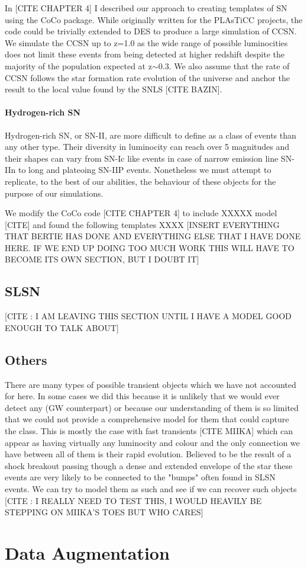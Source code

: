 In [CITE CHAPTER 4] I described our approach to creating templates of SN using the CoCo package. While originally written for the PLAsTiCC projects, the code could be trivially extended to DES to produce a large simulation of CCSN. We simulate the CCSN up to z=1.0 as the wide range of possible luminocities does not limit these events from being detected at higher redshift despite the majority of the population expected at z$\sim$0.3. We also assume that the rate of CCSN follows the star formation rate evolution of the universe and anchor the result to the local value found by the SNLS [CITE BAZIN]. \\

\paragraph{Hydrogen-rich SN}
Hydrogen-rich SN, or SN-II, are more difficult to define as a class of events than any other type. Their diversity in luminocity can reach over 5 magnitudes and their shapes can vary from SN-Ic like events in case of narrow emission line SN-IIn to long and plateoing SN-IIP events. Nonetheless we must attempt to replicate, to the best of our abilities, the behaviour of these objects for the purpose of our simulations.

We modify the CoCo code [CITE CHAPTER 4] to include XXXXX model [CITE] and found the following templates XXXX [INSERT EVERYTHING THAT BERTIE HAS DONE AND EVERYTHING ELSE THAT I HAVE DONE HERE. IF WE END UP DOING TOO MUCH WORK THIS WILL HAVE TO BECOME ITS OWN SECTION, BUT I DOUBT IT]

\subsection{SLSN}
[CITE : I AM LEAVING THIS SECTION UNTIL I HAVE A MODEL GOOD ENOUGH TO TALK ABOUT]

\subsection{Others}
There are many types of possible transient objects which we have not accounted for here. In some cases we did this because it is unlikely that we would ever detect any (GW counterpart) or because our understanding of them is so limited that we could not provide a comprehensive model for them that could capture the class. This is mostly the case with fast transients [CITE MIIKA] which can appear as having virtually any luminocity and colour and the only connection we have between all of them is their rapid evolution. Believed to be the result of a shock breakout passing though a dense and extended envelope of the star these events are very likely to be connected to the "bumps" often found in SLSN events. We can try to model them as such and see if we can recover such objects [CITE : I REALLY NEED TO TEST THIS, I WOULD HEAVILY BE STEPPING ON MIIKA'S TOES BUT WHO CARES] 

\section{Data Augmentation}
